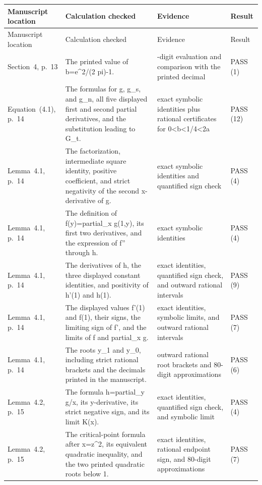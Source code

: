 {\footnotesize
\setlength{\tabcolsep}{2pt}
\begin{longtable}{@{}>{\raggedright\arraybackslash}p{30mm}>{\raggedright\arraybackslash}p{64mm}>{\raggedright\arraybackslash}p{44mm}>{\raggedright\arraybackslash}p{16mm}@{}}
\toprule
Manuscript location & Calculation checked & Evidence & Result \\
\midrule\endfirsthead
\toprule
Manuscript location & Calculation checked & Evidence & Result \\
\midrule\endhead
\bottomrule\endfoot
Section~4, p.~13 & The printed value of b=e\textasciicircum{}2/(2 pi)-1. & 80-digit evaluation and comparison with the printed decimal & PASS (1) \\
Equation~(4.1), p.~14 & The formulas for g, g\_s, and g\_n, all five displayed first and second partial derivatives, and the substitution leading to G\_t. & exact symbolic identities plus rational certificates for 0<b<1/4<2a & PASS (12) \\
Lemma~4.1, p.~14 & The factorization, intermediate square identity, positive coefficient, and strict negativity of the second x-derivative of g. & exact symbolic identities and quantified sign check & PASS (4) \\
Lemma~4.1, p.~14 & The definition of f(y)=partial\_x g(1,y), its first two derivatives, and the expression of f'' through h. & exact symbolic identities & PASS (4) \\
Lemma~4.1, p.~14 & The derivatives of h, the three displayed constant identities, and positivity of h'(1) and h(1). & exact identities, quantified sign check, and outward rational intervals & PASS (9) \\
Lemma~4.1, p.~14 & The displayed values f'(1) and f(1), their signs, the limiting sign of f', and the limits of f and partial\_x g. & exact identities, symbolic limits, and outward rational intervals & PASS (7) \\
Lemma~4.1, p.~14 & The roots y\_1 and y\_0, including strict rational brackets and the decimals printed in the manuscript. & outward rational root brackets and 80-digit approximations & PASS (6) \\
Lemma~4.2, p.~15 & The formula h=partial\_y g/x, its y-derivative, its strict negative sign, and its limit K(x). & exact identities, quantified sign check, and symbolic limit & PASS (4) \\
Lemma~4.2, p.~15 & The critical-point formula after x=z\textasciicircum{}2, its equivalent quadratic inequality, and the two printed quadratic roots below 1. & exact identities, rational endpoint sign, and 80-digit approximations & PASS (7) \\

\end{longtable}}
